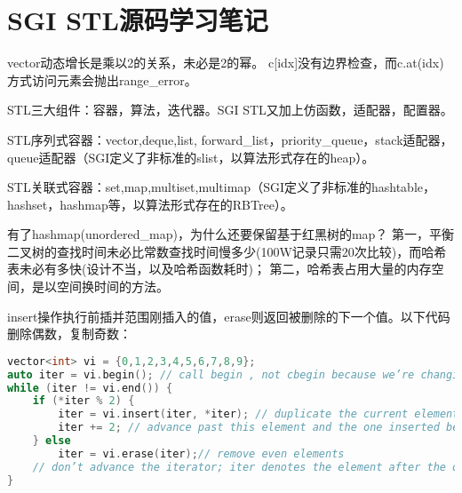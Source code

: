 \section{SGI STL源码学习笔记}

vector动态增长是乘以2的关系，未必是2的幂。
c[idx]没有边界检查，而c.at(idx)方式访问元素会抛出range\_error。

STL三大组件：容器，算法，迭代器。SGI STL又加上仿函数，适配器，配置器。

STL序列式容器：vector,deque,list, forward\_list，priority\_queue，stack适配器，queue适配器（SGI定义了非标准的slist，以算法形式存在的heap）。

STL关联式容器：set,map,multiset,multimap（SGI定义了非标准的hashtable，hashset，hashmap等，以算法形式存在的RBTree）。

有了hashmap(unordered\_map)，为什么还要保留基于红黑树的map？
第一，平衡二叉树的查找时间未必比常数查找时间慢多少(100W记录只需20次比较)，而哈希表未必有多快(设计不当，以及哈希函数耗时)；
第二，哈希表占用大量的内存空间，是以空间换时间的方法。

insert操作执行前插并范围刚插入的值，erase则返回被删除的下一个值。以下代码删除偶数，复制奇数：
\begin{lstlisting}[language=C++] 
vector<int> vi = {0,1,2,3,4,5,6,7,8,9};
auto iter = vi.begin(); // call begin , not cbegin because we’re changing vi
while (iter != vi.end()) {
	if (*iter % 2) {
		iter = vi.insert(iter, *iter); // duplicate the current element
		iter += 2; // advance past this element and the one inserted before it
	} else
		iter = vi.erase(iter);// remove even elements	
	// don’t advance the iterator; iter denotes the element after the one we erased
}
\end{lstlisting}




